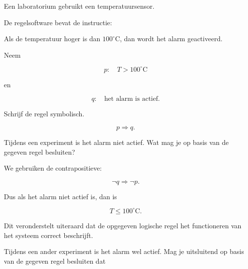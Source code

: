\documentclass{ximera}
\begin{document}

\begin{oefening}{\oefU\ESS}

Een laboratorium gebruikt een temperatuursensor.

De regelsoftware bevat de instructie:

\begin{center}
Als de temperatuur hoger is dan $100^\circ\mathrm{C}$,
dan wordt het alarm geactiveerd.
\end{center}

Neem

\[
p:\quad T>100^\circ\mathrm{C}
\]

en

\[
q:\quad \text{het alarm is actief}.
\]

\begin{question}

Schrijf de regel symbolisch.

\begin{oplossing}

\[
p\Rightarrow q.
\]

\end{oplossing}

\end{question}


\begin{question}

Tijdens een experiment is het alarm niet actief.
Wat mag je op basis van de gegeven regel besluiten?

\begin{oplossing}

We gebruiken de contrapositieve:

\[
\neg q\Rightarrow\neg p.
\]

Dus als het alarm niet actief is, dan is

\[
T\leq100^\circ\mathrm{C}.
\]

Dit veronderstelt uiteraard dat de opgegeven logische regel het
functioneren van het systeem correct beschrijft.

\end{oplossing}

\end{question}


\begin{question}

Tijdens een ander experiment is het alarm wel actief.
Mag je uitsluitend op basis van de gegeven regel besluiten dat


\end{question}
\end{oefening}
\end{document}
